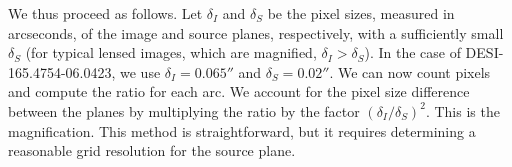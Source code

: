We thus proceed as follows. 
Let $\delta_I$ and $\delta_S$ be the pixel sizes, measured in arcseconds, of the image and source planes, respectively, with a sufficiently small $\delta_S$ (for typical lensed images, which are magnified, $\delta_I > \delta_S$).
In the case of DESI-165.4754-06.0423, we use  $\delta_I = 0.065''$ and $\delta_S = 0.02''$.
We can now count pixels and compute the ratio for each arc. 
We account for the pixel size difference between the planes
by multiplying the ratio by the factor $(\delta_I/\delta_S)^2$. This is the magnification.
This method is straightforward, but it requires determining a reasonable grid resolution for the source plane. %


